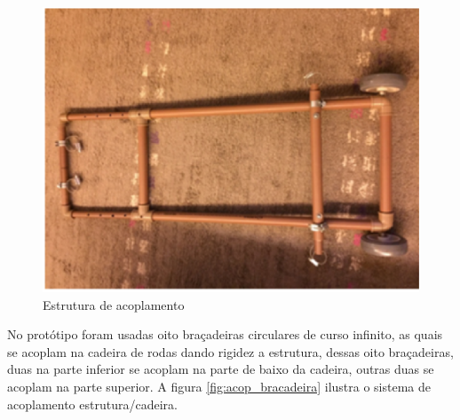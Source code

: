 \begin{figure}[!htb]
\centering
\includegraphics[keepaspectratio=true,scale=0.7]{figuras/resultados/acoplamento}
\caption{Estrutura de acoplamento}
\label{fig:acoplamento}
\end{figure}

No protótipo foram usadas oito braçadeiras circulares de curso infinito, as quais se acoplam na cadeira de rodas dando rigidez a estrutura, dessas oito braçadeiras, duas na parte inferior se acoplam na parte de baixo da cadeira, outras duas se acoplam na parte superior. A figura \ref{fig:acop_bracadeira} ilustra o sistema de acoplamento estrutura/cadeira.

